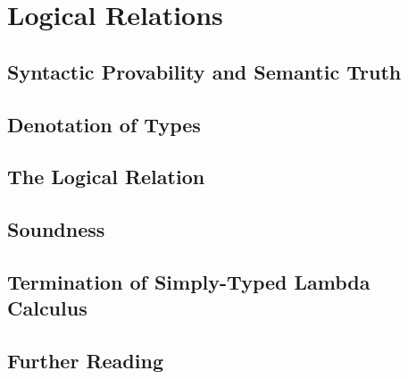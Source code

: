 \chapter{Logical Relations}

\section{Syntactic Provability and Semantic Truth}


\section{Denotation of Types}

\section{The Logical Relation}


\section{Soundness}


\section{Termination of Simply-Typed Lambda Calculus}

\section{Further Reading}
